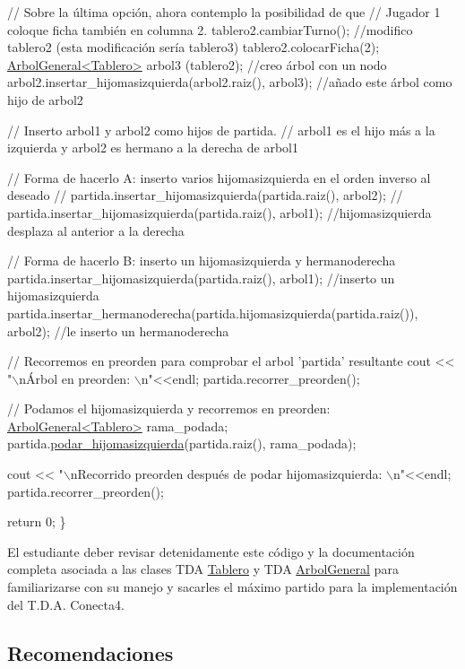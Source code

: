 \begin{DoxyCode}
    \textcolor{comment}{// Sobre la última opción, ahora contemplo la posibilidad de que }
    \textcolor{comment}{//  Jugador 1 coloque ficha también en columna 2. }
    tablero2.cambiarTurno();          \textcolor{comment}{//modifico tablero2 (esta modificación sería tablero3)}
    tablero2.colocarFicha(2); 
    \hyperlink{classArbolGeneral}{ArbolGeneral<Tablero>} arbol3 (tablero2);  \textcolor{comment}{//creo árbol con un nodo}
    arbol2.insertar\_hijomasizquierda(arbol2.raiz(), arbol3);  \textcolor{comment}{//añado este árbol como hijo de arbol2}

    \textcolor{comment}{// Inserto arbol1 y arbol2 como hijos de partida. }
    \textcolor{comment}{// arbol1 es el hijo más a la izquierda y arbol2 es hermano a la derecha de arbol1}
  
    \textcolor{comment}{//  Forma de hacerlo A: inserto varios hijomasizquierda en el orden inverso al deseado}
    \textcolor{comment}{//  partida.insertar\_hijomasizquierda(partida.raiz(), arbol2);}
    \textcolor{comment}{//  partida.insertar\_hijomasizquierda(partida.raiz(), arbol1);  //hijomasizquierda desplaza al anterior
       a la derecha}
  
    \textcolor{comment}{// Forma de hacerlo B: inserto un hijomasizquierda y hermanoderecha}
    partida.insertar\_hijomasizquierda(partida.raiz(), arbol1);              \textcolor{comment}{//inserto un hijomasizquierda}
    partida.insertar\_hermanoderecha(partida.hijomasizquierda(partida.raiz()), arbol2);  \textcolor{comment}{//le inserto un
       hermanoderecha}
    

    \textcolor{comment}{// Recorremos en preorden para comprobar el arbol 'partida' resultante}
    cout << \textcolor{stringliteral}{"\(\backslash\)nÁrbol en preorden: \(\backslash\)n"}<<endl; 
    partida.recorrer\_preorden();

    \textcolor{comment}{// Podamos el hijomasizquierda y recorremos en preorden: }
    \hyperlink{classArbolGeneral}{ArbolGeneral<Tablero>} rama\_podada;
    partida.\hyperlink{classArbolGeneral_a7f2fa2d9be4af4b7be1c334819a04c39}{podar\_hijomasizquierda}(partida.raiz(), rama\_podada);

    cout << \textcolor{stringliteral}{"\(\backslash\)nRecorrido preorden después de podar hijomasizquierda: \(\backslash\)n"}<<endl; 
    partida.recorrer\_preorden();

    \textcolor{keywordflow}{return} 0;
\}
\end{DoxyCode}


El estudiante deber revisar detenidamente este código y la documentación completa asociada a las clases T\+DA \hyperlink{classTablero}{Tablero} y T\+DA \hyperlink{classArbolGeneral}{Arbol\+General} para familiarizarse con su manejo y sacarles el máximo partido para la implementación del T.\+D.\+A. Conecta4.\hypertarget{index_recomendaciones}{}\subsection{Recomendaciones}\label{index_recomendaciones}

